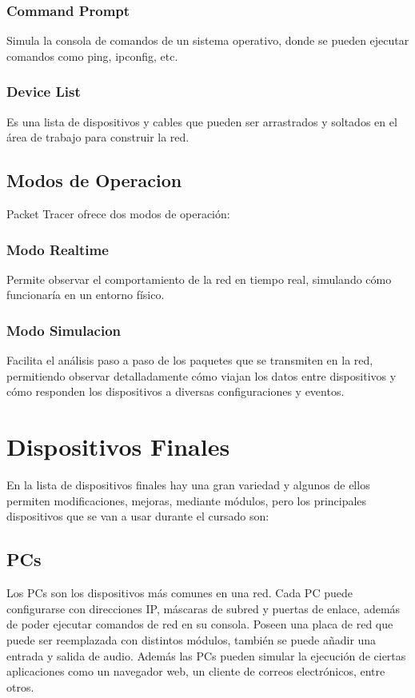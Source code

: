\documentclass{article}
\begin{document}
\subsubsection{Command Prompt}
\hspace{1cm}
Simula la consola de comandos de un sistema operativo, donde se pueden ejecutar comandos como ping, ipconfig, etc.
\subsubsection{Device List}
\hspace{1cm}
Es una lista de dispositivos y cables que pueden ser arrastrados y soltados en el área de trabajo para construir la red.

\subsection{Modos de Operacion}
\hspace{1cm}Packet Tracer ofrece dos modos de operación:
\subsubsection{Modo Realtime}
\hspace{1cm}
Permite observar el comportamiento de la red en tiempo real, simulando cómo funcionaría en un entorno físico.

\subsubsection{Modo Simulacion}
\hspace{1cm}
Facilita el análisis paso a paso de los paquetes que se transmiten en la red, permitiendo observar detalladamente cómo viajan los datos entre dispositivos y cómo responden los dispositivos a diversas configuraciones y eventos.

\section{Dispositivos Finales}
\hspace{1cm}
En la lista de dispositivos finales hay una gran variedad y algunos de ellos permiten modificaciones, mejoras, mediante módulos, pero los principales dispositivos que se van a usar durante el cursado son:

\subsection{PCs}
\hspace{1cm}
Los PCs son los dispositivos más comunes en una red. Cada PC puede configurarse con direcciones IP, máscaras de subred y puertas de enlace, además de poder ejecutar comandos de red en su consola. Poseen una placa de red que puede ser reemplazada con distintos módulos, también se puede añadir una entrada y salida de audio. Además las PCs pueden simular la ejecución de ciertas aplicaciones como un navegador web, un cliente de correos electrónicos, entre otros.
\end{document}
